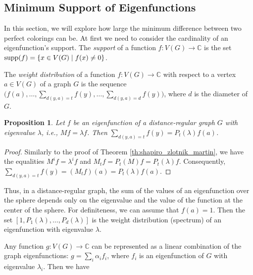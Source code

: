 \documentclass[11pt]{article}
\newtheorem{claim}{Proposition}[section]
\theoremstyle{definition}
\newcommand{\supp}{{\rm supp}}
\begin{document}



\subsection{Minimum Support of Eigenfunctions}\label{4.4}


In this section, we will explore how large the minimum difference between two perfect colorings can be. At first we need to consider the cardinality  of an eigenfunction's support.
The {\sl support}
of a function $f:V(G)\rightarrow \mathbb{C}$ is the set $\supp(f)=\{x\in V(G) \mid f(x)\ne
0\}$.
{
The {\sl weight distribution} of a function $f:V(G)\rightarrow \mathbb{C}$
with respect to a vertex $a\in V(G)$ of a graph $G$ is the sequence
$\Big(f(a),\dots,\sum\limits_{d(y,a)=t}f(y),\dots,\sum\limits_{d(y,a)=d}f(y)\Big)$,
where $d$ is the diameter of $G$.

\begin{claim}\label{c:WDB_bound0}
Let $f$
be an eigenfunction of a distance-regular graph $G$ with eigenvalue
$\lambda$, i.e., $Mf=\lambda f$.
Then $\sum\limits_{d(y,a)=t}f(y)=P_t(\lambda) f(a)$.
\end{claim}
\begin{proof}
Similarly to the proof of  Theorem \ref{th:shapiro_zlotnik_martin}, we have
the equalities $M^i f=\lambda^i f$ and $M_t f = P_t(M) f = P_t(\lambda) f$.
Consequently,
$\sum\limits_{d(y,a)=t}f(y)=(M_tf)(a)=P_t(\lambda) f(a)$.
\end{proof}

{ Thus, in a distance-regular graph, the sum of the values
of an eigenfunction over the sphere depends only on the eigenvalue and
the value of the function at the center of the sphere. For definiteness, we can assume
that $f(a)=1$. Then the set $[1, P_1(\lambda),\ldots,P_d(\lambda)]$
is the weight distribution (spectrum) of an eigenfunction with
eigenvalue $\lambda$.}

Any function $g:V(G)\rightarrow \mathbb{C}$ can be represented as
a linear combination of the graph eigenfunctions:
$g=\sum_i\alpha_if_i$, where $f_i$ is an eigenfunction
of  $G$ with eigenvalue $\lambda_i$.
Then we have

}
\end{document}
